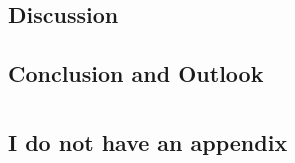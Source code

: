 \documentclass[UKenglish]{texmex/uiomasterthesis}
\begin{document}
\chapter{Discussion}

\chapter{Conclusion and Outlook}







\backmatter{}


\part*{}






\appendix

\chapter{I do not have an appendix}

\end{document}
